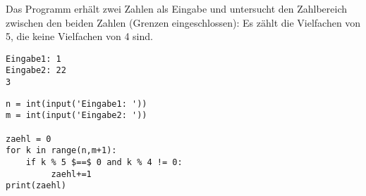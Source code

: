 \question[4]
Das Programm erhält zwei Zahlen als Eingabe und untersucht den Zahlbereich zwischen den
beiden Zahlen (Grenzen eingeschlossen):
Es zählt die Vielfachen von 5, die keine Vielfachen von 4 sind.

\begin{lstlisting}
Eingabe1: 1
Eingabe2: 22
3
\end{lstlisting}

\begin{solutionbox}{5cm}
\begin{lstlisting}
n = int(input('Eingabe1: '))
m = int(input('Eingabe2: '))

zaehl = 0
for k in range(n,m+1):
    if k % 5 $==$ 0 and k % 4 != 0:
         zaehl+=1
print(zaehl)
\end{lstlisting}
\end{solutionbox}
